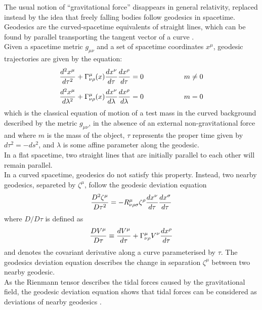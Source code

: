 \documentclass[binding=0.6cm, LaM]{sapthesis}
\begin{document}
	The usual notion of “gravitational force” disappears in general relativity, replaced instead 
	by the idea that freely falling bodies follow geodesics in spacetime.
	Geodesics are the curved-spacetime equivalents of straight lines, which can be found by 
	parallel transporting the tangent vector of a curve \cite{16}. \\
	Given a spacetime metric $g_{\mu\nu}$ and a set of spacetime coordinates $x^{\mu}$, 
	geodesic trajectories are given by the equation:
		\begin{equation}
			{{d^2x^{\mu}}\over{d\tau^2}} + \Gamma_{\nu\rho}^{\mu}(x){{dx^{\nu}}\over{d\tau}}{{dx^{\rho}}\over{d\tau}} = 0 \hspace*{2cm} m \neq 0
		\end{equation}
		\begin{equation}
			{{d^2x^{\mu}}\over{d\lambda^2}} + \Gamma_{\nu\rho}^{\mu}(x){{dx^{\nu}}\over{d\lambda}}{{dx^{\rho}}\over{d\lambda}} = 0 \hspace*{2cm} m = 0
		\end{equation}
	which is the classical equation of motion of a test mass in the curved background described 
	by the metric $g_{\mu\nu}$, in the absence of an external non-gravitational force and where $m$ is the mass
	of the object, $\tau$ represents the proper time given by $d\tau^2 = -ds^2$, 
	and $\lambda$ is some affine parameter along the geodesic. \\
	In a flat spacetime, two straight lines that are initially parallel to each other will remain parallel. \\
	In a curved spacetime, geodesics do not satisfy this property.
	Instead, two nearby geodesics, separeted by $\zeta^{\mu}$, follow the geodesic deviation equation
		\begin{equation}
			{{D^2\zeta^{\mu}}\over{D\tau^2}} = -R^{\mu}_{\nu\rho\sigma}\zeta^{\rho}{{dx^{\nu}}\over{d\tau}}{{dx^{\sigma}}\over{d\tau}}
		\end{equation}
	where $D/D\tau$ is defined as
		\begin{equation}
			{{DV^{\mu}}\over{D\tau}} \equiv {{dV^{\mu}}\over{d\tau}} + \Gamma^{\mu}_{\nu\rho}V^{\nu}{{dx^{\rho}}\over{d\tau}}
		\end{equation}
	and denotes the covariant derivative along a curve parameterised by $\tau$. 
	The geodesics deviation equation describes the change in separation $\zeta^{\mu}$ between two nearby geodesic. \\
	As the Rienmann tensor describes the tidal forces caused by the gravitational field, 
	the geodesic deviation equation shows that tidal forces can be considered as deviations of nearby geodesics \cite{6}.
\end{document}
